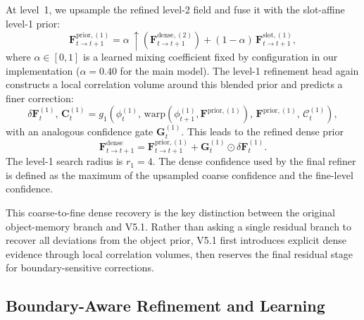 At level~1, we upsample the refined level-2 field and fuse it with the slot-affine level-1 prior:
\begin{equation}
\label{eq:prior_blend}
\mathbf{F}^{\mathrm{prior},(1)}_{t\rightarrow t+1} = \alpha\,\uparrow\!\left(\mathbf{F}^{\mathrm{dense},(2)}_{t\rightarrow t+1}\right) + (1-\alpha)\,\mathbf{F}^{\mathrm{slot},(1)}_{t\rightarrow t+1},
\end{equation}
where $\alpha\in[0,1]$ is a learned mixing coefficient fixed by configuration in our implementation ($\alpha=0.40$ for the main model). The level-1 refinement head again constructs a local correlation volume around this blended prior and predicts a finer correction:
\begin{equation}
\delta \mathbf{F}_t^{(1)},\, \mathbf{C}_t^{(1)} = g_1\left(\phi_t^{(1)},\, \mathrm{warp}(\phi_{t+1}^{(1)},\mathbf{F}^{\mathrm{prior},(1)}),\, \mathbf{F}^{\mathrm{prior},(1)},\, \mathcal{C}_t^{(1)}\right),
\end{equation}
with an analogous confidence gate $\mathbf{G}^{(1)}_t$. This leads to the refined dense prior
\begin{equation}
\label{eq:dense_prior}
\mathbf{F}^{\mathrm{dense}}_{t\rightarrow t+1} = \mathbf{F}^{\mathrm{prior},(1)}_{t\rightarrow t+1} + \mathbf{G}^{(1)}_t \odot \delta \mathbf{F}_t^{(1)}.
\end{equation}
The level-1 search radius is $r_1=4$. The dense confidence used by the final refiner is defined as the maximum of the upsampled coarse confidence and the fine-level confidence.

This coarse-to-fine dense recovery is the key distinction between the original object-memory branch and V5.1. Rather than asking a single residual branch to recover all deviations from the object prior, V5.1 first introduces explicit dense evidence through local correlation volumes, then reserves the final residual stage for boundary-sensitive corrections.

\subsection{Boundary-Aware Refinement and Learning}

